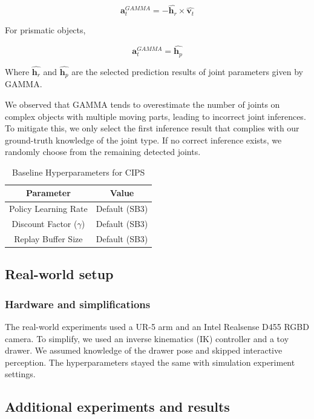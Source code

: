 \[
\boldsymbol{a}_t^{GAMMA}=-\hat{\boldsymbol{h}_r} \times \hat{\boldsymbol{v}_t}
\]

For prismatic objects, 

\[
\boldsymbol{a}_t^{GAMMA}=
\hat{\boldsymbol{h}_p}
\]

Where $\hat{\boldsymbol{h}_r}$ and $\hat{\boldsymbol{h}_p}$ are the selected prediction results of joint parameters given by GAMMA.

We observed that GAMMA tends to overestimate the number of joints on complex objects with multiple moving parts, leading to incorrect joint inferences. To mitigate this, we only select the first inference result that complies with our ground-truth knowledge of the joint type. If no correct inference exists, we randomly choose from the remaining detected joints.

\begin{table}[t]
\centering
\begin{tabular}{cc}
\toprule
\textbf{Parameter} & \textbf{Value} \\
\midrule
Policy Learning Rate & Default (SB3) \\
Discount Factor (\(\gamma\)) & Default (SB3) \\
Replay Buffer Size & Default (SB3) \\
\bottomrule
\end{tabular}
\caption{Baseline Hyperparameters for CIPS}
\end{table}

\subsection{Real-world setup}

\subsubsection{Hardware and simplifications}
The real-world experiments used a UR-5 arm and an Intel Realsense D455 RGBD camera. To simplify, we used an inverse kinematics (IK) controller and a toy drawer. We assumed knowledge of the drawer pose and skipped interactive perception. The hyperparameters stayed the same with simulation experiment settings.
\subsection{Additional experiments and results}

